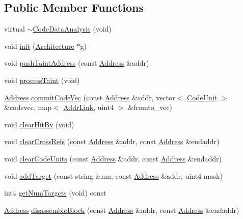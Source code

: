 \subsection*{Public Member Functions}
\begin{DoxyCompactItemize}
\item 
virtual \mbox{\hyperlink{class_code_data_analysis_aafb112248968cfe4a812d27b022703af}{$\sim$\+Code\+Data\+Analysis}} (void)
\item 
void \mbox{\hyperlink{class_code_data_analysis_a0d201fd15ac961362b9dc8b51134bea3}{init}} (\mbox{\hyperlink{class_architecture}{Architecture}} $\ast$g)
\item 
void \mbox{\hyperlink{class_code_data_analysis_aa8cc98d84537294fa40b2f6dd9dce67c}{push\+Taint\+Address}} (const \mbox{\hyperlink{class_address}{Address}} \&addr)
\item 
void \mbox{\hyperlink{class_code_data_analysis_af81c1c8ff3416ae4487a9d81eb0c1df3}{process\+Taint}} (void)
\item 
\mbox{\hyperlink{class_address}{Address}} \mbox{\hyperlink{class_code_data_analysis_aa6c8fe296a63965974a3cc279e1a7c65}{commit\+Code\+Vec}} (const \mbox{\hyperlink{class_address}{Address}} \&addr, vector$<$ \mbox{\hyperlink{class_code_unit}{Code\+Unit}} $>$ \&codevec, map$<$ \mbox{\hyperlink{struct_addr_link}{Addr\+Link}}, uint4 $>$ \&fromto\+\_\+vec)
\item 
void \mbox{\hyperlink{class_code_data_analysis_a8f2c1a7e1a417f0333a5974afdc0e995}{clear\+Hit\+By}} (void)
\item 
void \mbox{\hyperlink{class_code_data_analysis_a0a06f9379e9589429827bd9aa4cd8b0a}{clear\+Cross\+Refs}} (const \mbox{\hyperlink{class_address}{Address}} \&addr, const \mbox{\hyperlink{class_address}{Address}} \&endaddr)
\item 
void \mbox{\hyperlink{class_code_data_analysis_afa5b4f6f0ba4c12e7700fbf5738c32e7}{clear\+Code\+Units}} (const \mbox{\hyperlink{class_address}{Address}} \&addr, const \mbox{\hyperlink{class_address}{Address}} \&endaddr)
\item 
void \mbox{\hyperlink{class_code_data_analysis_a67d42a5bdfb0801cb8ae03e4d8c5b021}{add\+Target}} (const string \&nm, const \mbox{\hyperlink{class_address}{Address}} \&addr, uint4 mask)
\item 
int4 \mbox{\hyperlink{class_code_data_analysis_a1f9e8eeaba902f353013deeb95ccf20c}{get\+Num\+Targets}} (void) const
\item 
\mbox{\hyperlink{class_address}{Address}} \mbox{\hyperlink{class_code_data_analysis_adee07d792d5bf97891fb5d79c3c44d3a}{disassemble\+Block}} (const \mbox{\hyperlink{class_address}{Address}} \&addr, const \mbox{\hyperlink{class_address}{Address}} \&endaddr)

\end{DoxyCompactItemize}
